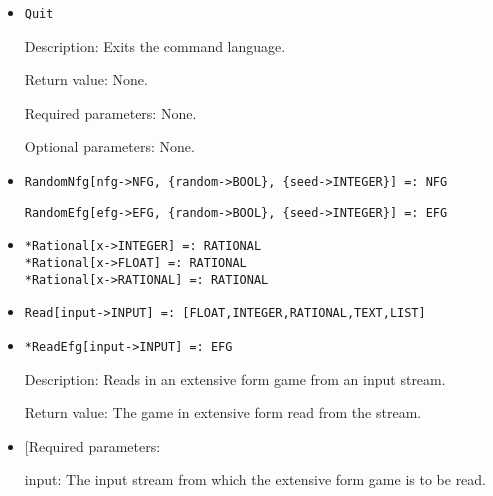\begin{itemize}


\item
\protect \large \begin{verbatim}
Quit
\end{verbatim}\normalsize

\bd

\item
[Description:] Exits the command language.
\item
[Return value:] None.
\item
[Required parameters:] None.
\item
[Optional parameters:] None.
\ed


\item
\protect \large \begin{verbatim}
RandomNfg[nfg->NFG, {random->BOOL}, {seed->INTEGER}] =: NFG
\end{verbatim}\normalsize
\protect \large \begin{verbatim}
RandomEfg[efg->EFG, {random->BOOL}, {seed->INTEGER}] =: EFG
\end{verbatim}\normalsize

\item
\protect \large \begin{verbatim}
*Rational[x->INTEGER] =: RATIONAL
*Rational[x->FLOAT] =: RATIONAL
*Rational[x->RATIONAL] =: RATIONAL
\end{verbatim} \normalsize


\item
\protect \large \begin{verbatim}
Read[input->INPUT] =: [FLOAT,INTEGER,RATIONAL,TEXT,LIST]
\end{verbatim}\normalsize

\item
\protect \large \begin{verbatim}
*ReadEfg[input->INPUT] =: EFG
\end{verbatim}\normalsize

\bd
\item
[Description:] Reads in an extensive form game from an input stream.  
\item
[Return value:] The game in extensive form read from the stream.
\item

[Required parameters:

\bd
\item
[input:] The input stream from which the extensive form game is to be
read. 
\ed


\end{itemize}
